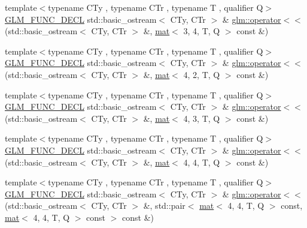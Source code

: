 \begin{DoxyCompactItemize}
\item 
{\footnotesize template$<$typename C\+Ty , typename C\+Tr , typename T , qualifier Q$>$ }\\\hyperlink{setup_8hpp_ab2d052de21a70539923e9bcbf6e83a51}{G\+L\+M\+\_\+\+F\+U\+N\+C\+\_\+\+D\+E\+CL} std\+::basic\+\_\+ostream$<$ C\+Ty, C\+Tr $>$ \& \hyperlink{group__gtx__io_gaa6f5541be2f182df05341e1d254c9a93}{glm\+::operator$<$$<$} (std\+::basic\+\_\+ostream$<$ C\+Ty, C\+Tr $>$ \&, \hyperlink{structglm_1_1mat}{mat}$<$ 3, 4, T, Q $>$ const \&)
\item 
{\footnotesize template$<$typename C\+Ty , typename C\+Tr , typename T , qualifier Q$>$ }\\\hyperlink{setup_8hpp_ab2d052de21a70539923e9bcbf6e83a51}{G\+L\+M\+\_\+\+F\+U\+N\+C\+\_\+\+D\+E\+CL} std\+::basic\+\_\+ostream$<$ C\+Ty, C\+Tr $>$ \& \hyperlink{group__gtx__io_gae565f5723d3912d17e295953290fd04b}{glm\+::operator$<$$<$} (std\+::basic\+\_\+ostream$<$ C\+Ty, C\+Tr $>$ \&, \hyperlink{structglm_1_1mat}{mat}$<$ 4, 2, T, Q $>$ const \&)
\item 
{\footnotesize template$<$typename C\+Ty , typename C\+Tr , typename T , qualifier Q$>$ }\\\hyperlink{setup_8hpp_ab2d052de21a70539923e9bcbf6e83a51}{G\+L\+M\+\_\+\+F\+U\+N\+C\+\_\+\+D\+E\+CL} std\+::basic\+\_\+ostream$<$ C\+Ty, C\+Tr $>$ \& \hyperlink{group__gtx__io_ga203dc1828e9c231fed8dc8c000db2e17}{glm\+::operator$<$$<$} (std\+::basic\+\_\+ostream$<$ C\+Ty, C\+Tr $>$ \&, \hyperlink{structglm_1_1mat}{mat}$<$ 4, 3, T, Q $>$ const \&)
\item 
{\footnotesize template$<$typename C\+Ty , typename C\+Tr , typename T , qualifier Q$>$ }\\\hyperlink{setup_8hpp_ab2d052de21a70539923e9bcbf6e83a51}{G\+L\+M\+\_\+\+F\+U\+N\+C\+\_\+\+D\+E\+CL} std\+::basic\+\_\+ostream$<$ C\+Ty, C\+Tr $>$ \& \hyperlink{group__gtx__io_ga269b4fa07fb9fe97faee573e9ccd9306}{glm\+::operator$<$$<$} (std\+::basic\+\_\+ostream$<$ C\+Ty, C\+Tr $>$ \&, \hyperlink{structglm_1_1mat}{mat}$<$ 4, 4, T, Q $>$ const \&)
\item 
{\footnotesize template$<$typename C\+Ty , typename C\+Tr , typename T , qualifier Q$>$ }\\\hyperlink{setup_8hpp_ab2d052de21a70539923e9bcbf6e83a51}{G\+L\+M\+\_\+\+F\+U\+N\+C\+\_\+\+D\+E\+CL} std\+::basic\+\_\+ostream$<$ C\+Ty, C\+Tr $>$ \& \hyperlink{group__gtx__io_gae88c98b45bbff402d42b08bcea9922cb}{glm\+::operator$<$$<$} (std\+::basic\+\_\+ostream$<$ C\+Ty, C\+Tr $>$ \&, std\+::pair$<$ \hyperlink{structglm_1_1mat}{mat}$<$ 4, 4, T, Q $>$ const, \hyperlink{structglm_1_1mat}{mat}$<$ 4, 4, T, Q $>$ const $>$ const \&)
\end{DoxyCompactItemize}


